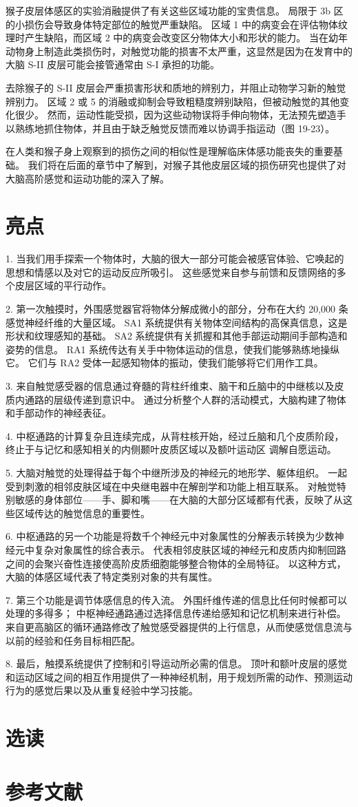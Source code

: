 猴子皮层体感区的实验消融提供了有关这些区域功能的宝贵信息。 局限于 3b 区的小损伤会导致身体特定部位的触觉严重缺陷。 区域 1 中的病变会在评估物体纹理时产生缺陷，而区域 2 中的病变会改变区分物体大小和形状的能力。 当在幼年动物身上制造此类损伤时，对触觉功能的损害不太严重，这显然是因为在发育中的大脑 S-II 皮层可能会接管通常由 S-I 承担的功能。

去除猴子的 S-II 皮层会严重损害形状和质地的辨别力，并阻止动物学习新的触觉辨别力。 区域 2 或 5 的消融或抑制会导致粗糙度辨别缺陷，但被动触觉的其他变化很少。 然而，运动性能受损，因为这些动物误将手伸向物体，无法预先塑造手以熟练地抓住物体，并且由于缺乏触觉反馈而难以协调手指运动（图 19-23）。

在人类和猴子身上观察到的损伤之间的相似性是理解临床体感功能丧失的重要基础。 我们将在后面的章节中了解到，对猴子其他皮层区域的损伤研究也提供了对大脑高阶感觉和运动功能的深入了解。

\section{亮点}

1. 当我们用手探索一个物体时，大脑的很大一部分可能会被感官体验、它唤起的思想和情感以及对它的运动反应所吸引。 这些感觉来自参与前馈和反馈网络的多个皮层区域的平行动作。 

2. 第一次触摸时，外围感觉器官将物体分解成微小的部分，分布在大约 20,000 条感觉神经纤维的大量区域。 SA1 系统提供有关物体空间结构的高保真信息，这是形状和纹理感知的基础。 SA2 系统提供有关抓握和其他手部运动期间手部构造和姿势的信息。 RA1 系统传达有关手中物体运动的信息，使我们能够熟练地操纵它。 它们与 RA2 受体一起感知物体的振动，使我们能够将它们用作工具。 

3. 来自触觉感受器的信息通过脊髓的背柱纤维束、脑干和丘脑中的中继核以及皮质内通路的层级传递到意识中。 通过分析整个人群的活动模式，大脑构建了物体和手部动作的神经表征。 

4. 中枢通路的计算复杂且连续完成，从背柱核开始，经过丘脑和几个皮质阶段，终止于与记忆和感知相关的内侧颞叶皮质区域以及额叶运动区 调解自愿运动。 

5. 大脑对触觉的处理得益于每个中继所涉及的神经元的地形学、躯体组织。 一起受到刺激的相邻皮肤区域在中央继电器中在解剖学和功能上相互联系。 对触觉特别敏感的身体部位——手、脚和嘴——在大脑的大部分区域都有代表，反映了从这些区域传达的触觉信息的重要性。 

6. 中枢通路的另一个功能是将数千个神经元中对象属性的分解表示转换为少数神经元中复杂对象属性的综合表示。 代表相邻皮肤区域的神经元和皮质内抑制回路之间的会聚兴奋性连接使高阶皮质细胞能够整合物体的全局特征。 以这种方式，大脑的体感区域代表了特定类别对象的共有属性。 

7. 第三个功能是调节体感信息的传入流。 外围纤维传递的信息比任何时候都可以处理的多得多； 中枢神经通路通过选择信息传递给感知和记忆机制来进行补偿。 来自更高脑区的循环通路修改了触觉感受器提供的上行信息，从而使感觉信息流与以前的经验和任务目标相匹配。 

8. 最后，触摸系统提供了控制和引导运动所必需的信息。 顶叶和额叶皮层的感觉和运动区域之间的相互作用提供了一种神经机制，用于规划所需的动作、预测运动行为的感觉后果以及从重复经验中学习技能。

\section{选读}
\section{参考文献}
